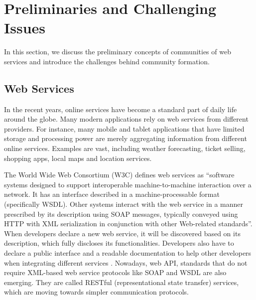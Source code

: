 \documentclass[11pt,onecolumn]{IEEEtran}
\begin{document}



\section{Preliminaries and Challenging Issues}\label{s:preliminaries}
In this section, we discuss the preliminary concepts of communities of web services and introduce the challenges behind community formation.

\subsection{Web Services}\label{s:ws}

In the recent years, online services have become a standard part of daily life around the globe. Many modern applications rely on web services from different providers. For instance, many mobile and tablet applications that have limited storage and processing power are merely aggregating information from different online services. Examples are vast, including weather forecasting, ticket selling, shopping apps, local maps and location services.

The World Wide Web Consortium (W3C) defines web services as ``software systems designed to support interoperable machine-to-machine interaction over a network. It has an interface described in a machine-processable format (specifically WSDL). Other systems interact with the web service in a manner prescribed by its description using SOAP messages, typically conveyed using HTTP with XML serialization in conjunction with other Web-related standards''. When developers declare a new web service, it will be
discovered based on its description, which fully discloses its functionalities. Developers also have to declare a public interface and a readable documentation to help other developers when integrating different services \cite{w3cwsdl}. Nowadays, web API, standards that do not require XML-based web service protocols like SOAP and WSDL are also emerging. They are called RESTful (representational state transfer) services, which are moving towards simpler communication protocols. 
\end{document}
